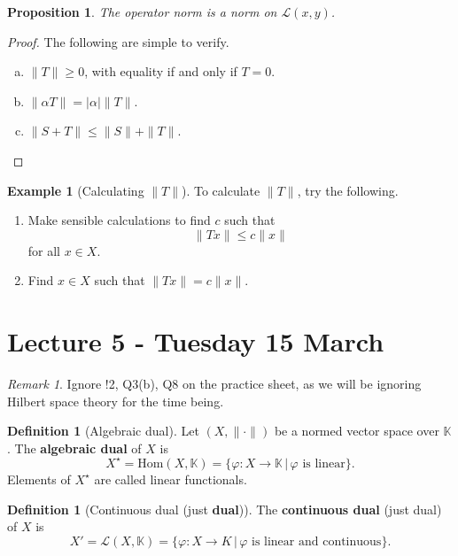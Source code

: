 \documentclass[10pt, oneside, reqno]{amsart}
\theoremstyle{plain}%
\newtheorem{prop}[thm]{Proposition}
\theoremstyle{definition}
\newtheorem{defn}[thm]{Definition}
\newtheorem{exmp}[thm]{Example}
\theoremstyle{remark}
\newtheorem*{rem}{Remark}
\newcommand{\K}{\mathbb{K}}
\renewcommand{\phi}{\varphi}
\begin{document}
\begin{prop}
    The operator norm is a norm on $\mathcal{L}(x,y)$.  
\end{prop}

\begin{proof}  The following are simple to verify.
    \begin{enumerate}[(a)]
        \item $\| T \| \geq 0$, with equality if and only if $ T = 0$. 
        \item $\| \alpha T \| = | \alpha | \|T \|$.
        \item $\| S + T \| \leq  \| S \| + \| T \|$.
    \end{enumerate}
\end{proof}

\begin{exmp}[Calculating $\| T \|$]
    To calculate $\| T \|$, try the following. 
    \begin{enumerate}[1)]
        \item Make sensible calculations to find $c$ such that \[
            \| Tx \| \leq c \| x \|
        \] for all $x \in X$.
        \item Find $x \in X$ such that $\|Tx \| = c \| x \|$.
    \end{enumerate}
\end{exmp}

\section{Lecture 5 - Tuesday 15 March} %
\label{sec:lecture_5_tusday_15_march}
\begin{rem}
    Ignore !2, Q3(b), Q8 on the practice sheet, as we will be ignoring Hilbert space theory for the time being.
\end{rem}

\begin{defn}[Algebraic dual]
    Let $(X, \| \cdot \|)$ be a normed vector space over $\K$.  The \textbf{algebraic dual} of $X$ is \[
        X^\star = \text{Hom}(X, \K) = \{ \phi: X \rightarrow \K \, | \, \text{$\phi$ is linear} \}.
    \]  Elements of $X^\star$ are called linear functionals.
\end{defn}

\begin{defn}[Continuous dual (just \textbf{dual})]
    The \textbf{continuous dual} (just dual) of $X$ is \[
        X' = \mathcal{L}(X, \K) = \{ \phi : X \rightarrow K \, | \, \text{$\phi$ is linear and continuous} \}.
    \]
\end{defn}
\end{document}
